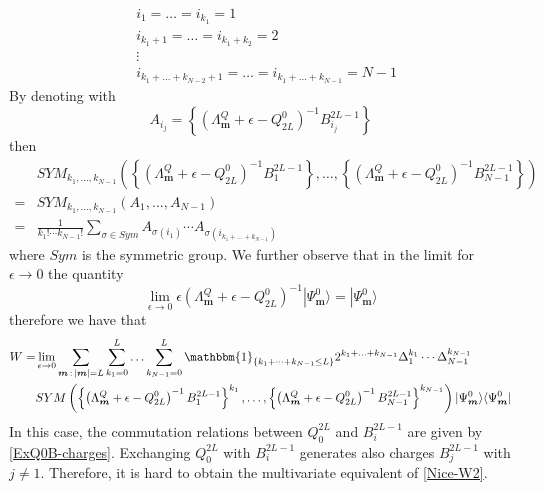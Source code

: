 \documentclass[10pt]{article}
\numberwithin{equation}{section}
\numberwithin{equation}{subsection}
\begin{document}
\begin{equation}
	\begin{split}
		&i_{1}=\ldots=i_{k_{1}}=1\\
	&	i_{k_{1}+1}=\ldots=i_{k_{1}+k_{2}}=2\\
		&\vdots\\
		&i_{k_{1}+\ldots+k_{N-2}+1}=\ldots=i_{k_{1}+\ldots+k_{N-1}}=N-1
	\end{split}
\end{equation}
By denoting with 
\begin{equation}\label{definitionA}
	A_{i_{j}}=\left\{\left(\Lambda_{\bm{m}}^{Q}+\epsilon-Q_{2L}^{0}\right)^{-1}B_{i_{j}}^{2L-1}\right\}
\end{equation}
then 
\begin{equation}
	\begin{split}
&SYM_{k_{1},\ldots,k_{N-1}}\left(\left\{\left(\Lambda_{\bm{m}}^{Q}+\epsilon-Q_{2L}^{0}\right)^{-1}B_{1}^{2L-1}\right\},\ldots,\left\{\left(\Lambda_{\bm{m}}^{Q}+\epsilon-Q_{2L}^{0}\right)^{-1}B_{N-1}^{2L-1}\right\}\right)\\=&
SYM_{k_{1},\ldots,k_{N-1}}\left(A_{1},\ldots,A_{N-1}\right)\\
=&\frac{1}{k_{1}!\cdots k_{N-1}!}\sum_{\sigma\in Sym}A_{\sigma(i_{1})}\cdots A_{\sigma(i_{k_{1}+\ldots+k_{N-1}})}
	\end{split}
\end{equation}
where $Sym$ is the symmetric group. 
We further observe that in the limit for $\epsilon\to 0$ the quantity 
\begin{equation}
	\lim_{\epsilon\to 0}	\epsilon\left(\Lambda_{\bm{m}}^{Q}+\epsilon-Q_{2L}^{0}\right)^{-1}|\Psi_{\bm{m}}^{0}\rangle=|\Psi_{\bm{m}}^{0}\rangle
\end{equation}
therefore we have that 
\begin{equation}\label{W-charges-Bad}
	\begin{split}
		W=&\lim_{\epsilon\to 0}\sum_{\bm{m}\,:\,|\bm{m}|=L}\sum_{k_{1}=0}^{L}\ldots\sum_{k_{N-1}=0}^{L}\mathbbm{1}_{\{k_{1}+\cdots+k_{N-1}\leq L\}}2^{k_{1}+\ldots+k_{N-1}}\Delta_{1}^{k_{1}}\cdots\Delta_{N-1}^{k_{N-1}}\\&SYM\left(\left\{\left(\Lambda_{\bm{m}}^{Q}+\epsilon-Q_{2L}^{0}\right)^{-1}B_{1}^{2L-1}\right\}^{k_{1}},\ldots,\left\{\left(\Lambda_{\bm{m}}^{Q}+\epsilon-Q_{2L}^{0}\right)^{-1}B_{N-1}^{2L-1}\right\}^{k_{N-1}}\right)
		|\Psi_{\bm{m}}^{0}\rangle \langle \Psi_{\bm{m}}^{0}|
	\end{split}
\end{equation}
In this case, the commutation relations between $Q_{0}^{2L}$ and $B_{i}^{2L-1}$ are given by \eqref{ExQ0B-charges}. Exchanging $Q_{0}^{2L}$ with $B_{i}^{2L-1}$ generates also charges $B_{j}^{2L-1}$ with $j\neq 1$. Therefore, it is hard to obtain the multivariate equivalent of \eqref{Nice-W2}. 
\end{document}
